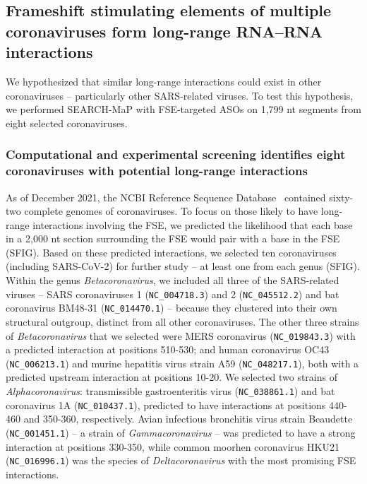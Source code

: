 \documentclass[main.tex]{subfiles}
\begin{document}
\subsection{Frameshift stimulating elements of multiple coronaviruses form long-range RNA--RNA interactions}

We hypothesized that similar long-range interactions could exist in other coronaviruses -- particularly other SARS-related viruses.
To test this hypothesis, we performed SEARCH-MaP with FSE-targeted ASOs on 1,799 nt segments from eight selected coronaviruses.


\subsubsection{Computational and experimental screening identifies eight coronaviruses with potential long-range interactions}

As of December 2021, the NCBI Reference Sequence Database~\cite{OLeary2016} contained sixty-two complete genomes of coronaviruses.
To focus on those likely to have long-range interactions involving the FSE, we predicted the likelihood that each base in a 2,000 nt section surrounding the FSE would pair with a base in the FSE (SFIG).
Based on these predicted interactions, we selected ten coronaviruses (including SARS-CoV-2) for further study -- at least one from each genus (SFIG).
Within the genus \textit{Betacoronavirus}, we included all three of the SARS-related viruses -- SARS coronaviruses 1 (\verb|NC_004718.3|) and 2 (\verb|NC_045512.2|) and bat coronavirus BM48-31 (\verb|NC_014470.1|) -- because they clustered into their own structural outgroup, distinct from all other coronaviruses.
The other three strains of \textit{Betacoronavirus} that we selected were MERS coronavirus (\verb|NC_019843.3|) with a predicted interaction at positions 510-530; and human coronavirus OC43 (\verb|NC_006213.1|) and murine hepatitis virus strain A59 (\verb|NC_048217.1|), both with a predicted upstream interaction at positions 10-20.
We selected two strains of \textit{Alphacoronavirus}: transmissible gastroenteritis virus (\verb|NC_038861.1|) and bat coronavirus 1A (\verb|NC_010437.1|), predicted to have interactions at positions 440-460 and 350-360, respectively.
Avian infectious bronchitis virus strain Beaudette (\verb|NC_001451.1|) -- a strain of \textit{Gammacoronavirus} -- was predicted to have a strong interaction at positions 330-350, while common moorhen coronavirus HKU21 (\verb|NC_016996.1|) was the species of \textit{Deltacoronavirus} with the most promising FSE interactions.
\end{document}
